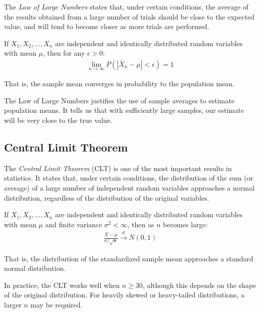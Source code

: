 The \emph{Law of Large Numbers} states that, under certain conditions, the average of the results obtained from a large number of trials should be close to the expected value, and will tend to become closer as more trials are performed.

\begin{teorema}
	\label{teo:5.1.1}
	If $X_1, X_2, \ldots, X_n$ are independent and identically distributed random variables with mean $\mu$, then for any $\epsilon > 0$:
	\begin{align}
		\lim_{n \to \infty} P(|\bar{X}_n - \mu| < \epsilon) = 1
	\end{align}

	That is, the sample mean converges in probability to the population mean.
\end{teorema}

\begin{observacion}
	The Law of Large Numbers justifies the use of sample averages to estimate population means. It tells us that with sufficiently large samples, our estimate will be very close to the true value.
\end{observacion}

\subsection*{Central Limit Theorem}

The \emph{Central Limit Theorem} (CLT) is one of the most important results in statistics. It states that, under certain conditions, the distribution of the sum (or average) of a large number of independent random variables approaches a normal distribution, regardless of the distribution of the original variables.

\begin{teorema}
	\label{teo:5.1.2}
	If $X_1, X_2, \ldots, X_n$ are independent and identically distributed random variables with mean $\mu$ and finite variance $\sigma^2 < \infty$, then as $n$ becomes large:
	\begin{align}
		\frac{\bar{X} - \mu}{\sigma/\sqrt{n}} \xrightarrow{d} N(0,1)
	\end{align}

	That is, the distribution of the standardized sample mean approaches a standard normal distribution.
\end{teorema}

\begin{observacion}
	In practice, the CLT works well when $n \geq 30$, although this depends on the shape of the original distribution. For heavily skewed or heavy-tailed distributions, a larger $n$ may be required.
\end{observacion}

